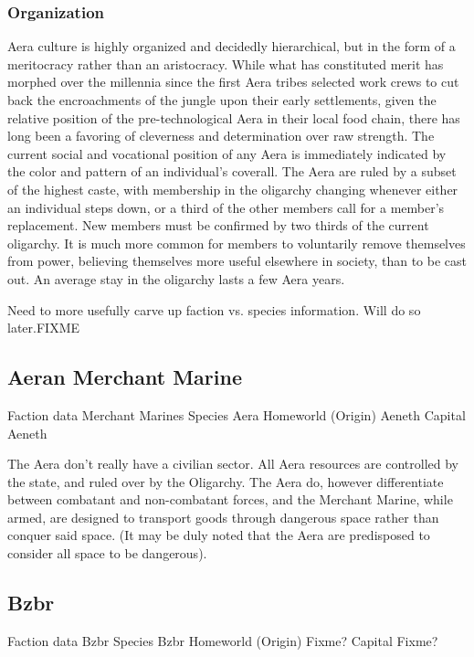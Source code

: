 \subsubsection{Organization}
Aera culture is highly organized and decidedly hierarchical, but in
the form of a meritocracy rather than an aristocracy. While what has
constituted merit has morphed over the millennia since the first Aera
tribes selected work crews to cut back the encroachments of the jungle
upon their early settlements, given the relative position of the
pre-technological Aera in their local food chain, there has long been
a favoring of cleverness and determination over raw strength. The
current social and vocational position of any Aera is immediately
indicated by the color and pattern of an individual's coverall. The
Aera are ruled by a subset of the highest caste, with membership in
the oligarchy changing whenever either an individual steps down, or a
third of the other members call for a member's replacement. New
members must be confirmed by two thirds of the current oligarchy. It
is much more common for members to voluntarily remove themselves from
power, believing themselves more useful elsewhere in society, than to
be cast out. An average stay in the oligarchy lasts a few Aera years.

Need to more usefully carve up faction vs. species information. Will
do so later.FIXME

\subsection{Aeran Merchant Marine}

Faction data 
Merchant Marines 
Species 	Aera 
Homeworld (Origin) 	Aeneth 
Capital 	Aeneth 

The Aera don't really have a civilian sector. All Aera resources are
controlled by the state, and ruled over by the Oligarchy. The Aera do,
however differentiate between combatant and non-combatant forces, and
the Merchant Marine, while armed, are designed to transport goods
through dangerous space rather than conquer said space. (It may be
duly noted that the Aera are predisposed to consider all space to be
dangerous).

\subsection{Bzbr}

Faction data 
Bzbr 
Species 	Bzbr 
Homeworld (Origin) 	Fixme? 
Capital 	Fixme? 
	
